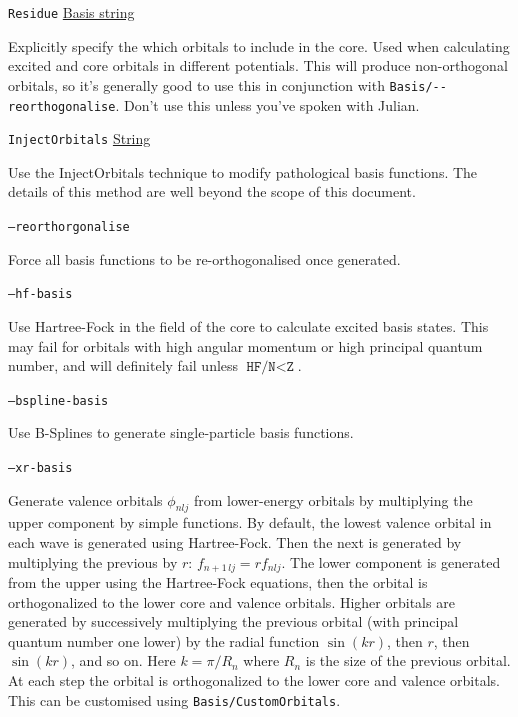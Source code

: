\documentclass{report}
\begin{document}
\texttt{Residue} \uline{Basis string}
\begin{adjustwidth}{1cm}{}
Explicitly specify the which orbitals to include in the core. Used when calculating excited and core
orbitals in different potentials. This will produce non-orthogonal orbitals, so it's generally good to
use this in conjunction with \texttt{Basis/{-}{-}reorthogonalise}. Don't use this unless you've spoken
with Julian.
\end{adjustwidth}

\texttt{InjectOrbitals} \uline{String}
\begin{adjustwidth}{1cm}{}
Use the InjectOrbitals technique to modify pathological basis functions. The details of this method are
well beyond the scope of this document.
\end{adjustwidth}

\texttt{--reorthorgonalise}
\begin{adjustwidth}{1cm}{}
Force all basis functions to be re-orthogonalised once generated.
\end{adjustwidth}

\texttt{--hf-basis}
\begin{adjustwidth}{1cm}{}
Use Hartree-Fock in the field of the core to calculate excited basis states. This may fail for orbitals with high angular momentum or high principal quantum number, and will definitely fail unless $\texttt{HF/N} < \texttt{Z}$.
\end{adjustwidth}

\texttt{--bspline-basis} 
\begin{adjustwidth}{1cm}{}
Use B-Splines to generate single-particle basis functions.
\end{adjustwidth}

\texttt{--xr-basis} 
\begin{adjustwidth}{1cm}{}
Generate valence orbitals $\phi_{nlj}$ from lower-energy orbitals by multiplying the upper component by simple functions. By default, the lowest valence orbital in each wave is generated using Hartree-Fock. Then the next is generated by multiplying the previous by $r$: $f_{n+1\,lj} = r f_{nlj}$. The lower component is generated from the upper using the Hartree-Fock equations, then the orbital is orthogonalized to the lower core and valence orbitals.
Higher orbitals are generated by successively multiplying the previous orbital (with principal quantum number one lower) by the radial function $\sin(kr)$, then $r$, then $\sin(kr)$, and so on. Here $k = \pi/R_n$ where $R_n$ is the size of the previous orbital. At each step the orbital is orthogonalized to the lower core and valence orbitals. This can be customised using \texttt{Basis/CustomOrbitals}.
\end{adjustwidth}
\end{document}
